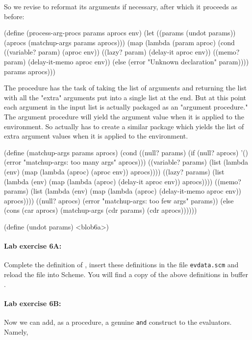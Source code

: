 So we revise  to reformat its arguments if
necessary, after which it proceeds as before:

\beginlisp
(define (process-arg-procs params aprocs env)
  (let ((params (undot params))
        (aprocs (matchup-args params aprocs)))
    (map (lambda (param aproc)
           (cond ((variable? param) (aproc env))
                 ((lazy? param) (delay-it aproc env))
                 ((memo? param) (delay-it-memo aproc env))
                 (else (error "Unknown declaration" param))))
         params
         aprocs)))
\endlisp

The procedure  has the task of taking the list of
arguments and returning the list with all the "extra" arguments put
into a single list at the end.  But at this point each argument in the
input list is actually packaged as an "argument procedure."  The
argument procedure will yield the argument value when it is applied to
the environment.  So  actually has to create a
similar package which yields the list of extra argument values when it
is applied to the environment.

\beginlisp
(define (matchup-args params aprocs)
  (cond
   ((null? params)
    (if (null? aprocs) '() (error "matchup-args: too many args" aprocs)))
   ((variable? params)
    (list
     (lambda (env)
       (map (lambda (aproc) (aproc env)) aprocs))))
   ((lazy? params)
    (list
     (lambda (env)
       (map (lambda (aproc) (delay-it aproc env)) aprocs))))
   ((memo? params)
    (list
     (lambda (env)
       (map (lambda (aproc) (delay-it-memo aproc env)) aprocs))))
   ((null? aprocs) (error "matchup-args: too few args" params))
   (else (cons
          (car aprocs)
          (matchup-args (cdr params) (cdr aprocs))))))
\endlisp

\medskip
\beginlisp
(define (undot params)
  <blob6a>)
\endlisp


\paragraph{Lab exercise 6A:}
Complete the definition of , insert these definitions in
the file {\tt evdata.scm} and reload the file into Scheme.  You will find
a copy of the above definitions in buffer .

\paragraph{Lab exercise 6B:}
Now we can add, as a procedure, a genuine {\tt and} construct to the
evaluators.  Namely,

